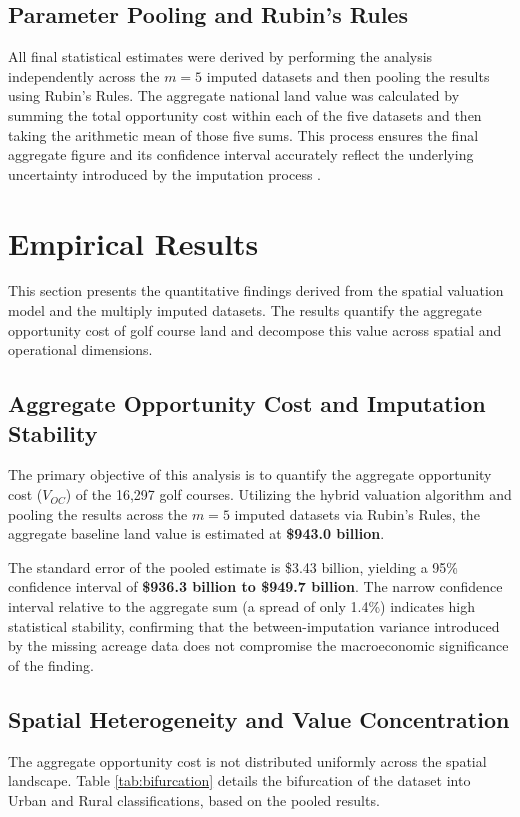 \documentclass[10pt, letterpaper]{article}
\begin{document}
\subsection{Parameter Pooling and Rubin's Rules}
All final statistical estimates were derived by performing the analysis independently across the $m=5$ imputed datasets and then pooling the results using Rubin's Rules. The aggregate national land value was calculated by summing the total opportunity cost within each of the five datasets and then taking the arithmetic mean of those five sums. This process ensures the final aggregate figure and its confidence interval accurately reflect the underlying uncertainty introduced by the imputation process \parencite{Burren2018}.

\newpage

\section{Empirical Results}

This section presents the quantitative findings derived from the spatial valuation model and the multiply imputed datasets. The results quantify the aggregate opportunity cost of golf course land and decompose this value across spatial and operational dimensions.

\subsection{Aggregate Opportunity Cost and Imputation Stability}
The primary objective of this analysis is to quantify the aggregate opportunity cost ($V_{OC}$) of the 16,297 golf courses. Utilizing the hybrid valuation algorithm and pooling the results across the $m=5$ imputed datasets via Rubin's Rules, the aggregate baseline land value is estimated at \textbf{\$943.0 billion}.

The standard error of the pooled estimate is \$3.43 billion, yielding a 95\% confidence interval of \textbf{\$936.3 billion to \$949.7 billion}. The narrow confidence interval relative to the aggregate sum (a spread of only 1.4\%) indicates high statistical stability, confirming that the between-imputation variance introduced by the missing acreage data does not compromise the macroeconomic significance of the finding.

\subsection{Spatial Heterogeneity and Value Concentration}
The aggregate opportunity cost is not distributed uniformly across the spatial landscape. Table \ref{tab:bifurcation} details the bifurcation of the dataset into Urban and Rural classifications, based on the pooled results.
\end{document}
